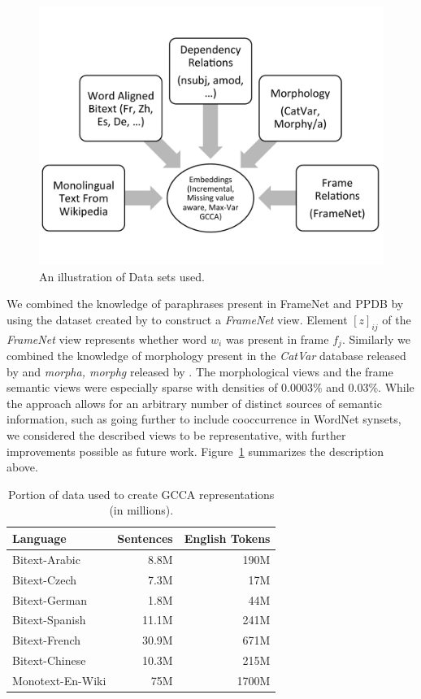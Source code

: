 \documentclass[11pt]{article}
\begin{document}
\begin{figure}
  \includegraphics[trim=0 70 0 35,clip,width=\linewidth]{cartoonbw.pdf}
  \caption{An illustration of Data sets used.}
  \label{fig:cartoon}
  \end{figure}


We combined the knowledge of paraphrases present in FrameNet and PPDB
by using the dataset created by  to
construct a \textit{FrameNet} view. Element $[z]_{ij}$ of the
\textit{FrameNet} view represents whether word $w_i$ was present in
frame $f_j$. Similarly we combined the knowledge of morphology present
in the \textit{CatVar} database released by 
and \textit{morpha, morphg} released by .
The morphological views and the frame semantic views were especially
sparse with densities of 0.0003\% and 0.03\%. While the approach
allows for an arbitrary number of distinct sources of semantic
information, such as going further to include cooccurrence in WordNet
synsets, we considered the described views to be representative, with
further improvements possible as future work.
Figure~\ref{fig:cartoon} summarizes the description above.

\begin{table}[htbp]
  \centering
  \begin{tabular}{lrr}
    Language & Sentences & English Tokens \\
    \hline
    Bitext-Arabic   & 8.8M   & 190M  \\
    Bitext-Czech    & 7.3M   & 17M   \\
    Bitext-German   & 1.8M   & 44M   \\
    Bitext-Spanish  & 11.1M  & 241M  \\
    Bitext-French   & 30.9M  & 671M  \\
    Bitext-Chinese  & 10.3M  & 215M  \\
    Monotext-En-Wiki& 75M    & 1700M 
  \end{tabular}  
  \caption{Portion of data used to create GCCA representations (in millions).}
  \label{tab:dataperlang}
\end{table}
\end{document}
